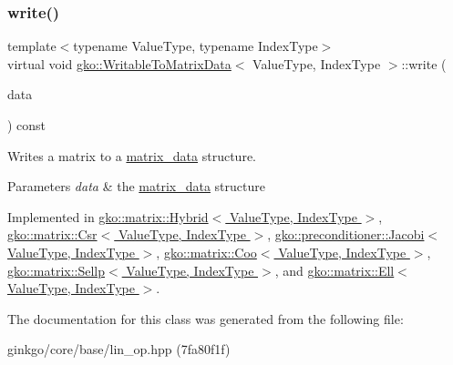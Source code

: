 \subsubsection{\texorpdfstring{write()}{write()}}
{\footnotesize\ttfamily template$<$typename Value\+Type, typename Index\+Type$>$ \\
virtual void \hyperlink{classgko_1_1WritableToMatrixData}{gko\+::\+Writable\+To\+Matrix\+Data}$<$ Value\+Type, Index\+Type $>$\+::write (\begin{DoxyParamCaption}\item[{\hyperlink{structgko_1_1matrix__data}{matrix\+\_\+data}$<$ Value\+Type, Index\+Type $>$ \&}]{data }\end{DoxyParamCaption}) const\hspace{0.3cm}{\ttfamily [pure virtual]}}



Writes a matrix to a \hyperlink{structgko_1_1matrix__data}{matrix\+\_\+data} structure. 


\begin{DoxyParams}{Parameters}
{\em data} & the \hyperlink{structgko_1_1matrix__data}{matrix\+\_\+data} structure \\
\hline
\end{DoxyParams}


Implemented in \hyperlink{classgko_1_1matrix_1_1Hybrid_a626c07541641bcdfd9a7f61322a89cbe}{gko\+::matrix\+::\+Hybrid$<$ Value\+Type, Index\+Type $>$}, \hyperlink{classgko_1_1matrix_1_1Csr_a205fc391f4cf4f7718a55b0a61f62bc9}{gko\+::matrix\+::\+Csr$<$ Value\+Type, Index\+Type $>$}, \hyperlink{classgko_1_1preconditioner_1_1Jacobi_ac52bb1c70d4882876da1ee21c3b124ee}{gko\+::preconditioner\+::\+Jacobi$<$ Value\+Type, Index\+Type $>$}, \hyperlink{classgko_1_1matrix_1_1Coo_ae193466ca1a4a3c7d1383ddc5a2701ab}{gko\+::matrix\+::\+Coo$<$ Value\+Type, Index\+Type $>$}, \hyperlink{classgko_1_1matrix_1_1Sellp_aae2355a2866318b154d017b1c51f30a5}{gko\+::matrix\+::\+Sellp$<$ Value\+Type, Index\+Type $>$}, and \hyperlink{classgko_1_1matrix_1_1Ell_afa9148a16a9255003055d8e9156ee941}{gko\+::matrix\+::\+Ell$<$ Value\+Type, Index\+Type $>$}.



The documentation for this class was generated from the following file\+:\begin{DoxyCompactItemize}
\item 
ginkgo/core/base/lin\+\_\+op.\+hpp (7fa80f1f)\end{DoxyCompactItemize}
